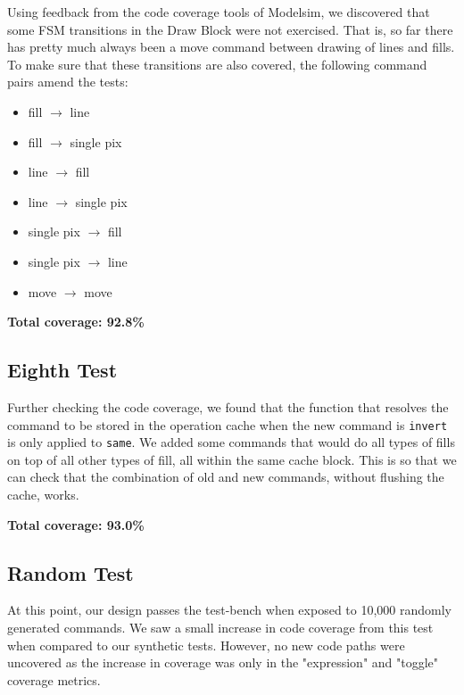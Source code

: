 \documentclass[]{article}
\begin{document}
Using feedback from the code coverage tools of Modelsim, we discovered that some FSM transitions in the Draw Block were not exercised. That is, so far there has pretty much always been a move command between drawing of lines and fills. To make sure that these transitions are also covered, the following command pairs amend the tests:
\begin{itemize}
	\item fill $\rightarrow$ line
	\item fill $\rightarrow$ single pix
	\item line $\rightarrow$ fill
	\item line $\rightarrow$ single pix
	\item single pix $\rightarrow$ fill
	\item single pix $\rightarrow$ line
	\item move $\rightarrow$ move
\end{itemize}

\textbf{Total coverage: 92.8\%}


\subsection{Eighth Test} %
\label{sub:eighth_test}

Further checking the code coverage, we found that the function that resolves the command to be stored in the operation cache when the new command is \verb"invert" is only applied to \verb"same".
We added some commands that would do all types of fills on top of all other types of fill, all within the same cache block. This is so that we can check that the combination of old and new commands, without flushing the cache, works.

\textbf{Total coverage: 93.0\%}


\subsection{Random Test} %
\label{sub:random_test}

At this point, our design passes the test-bench when exposed to 10,000 randomly generated commands. We saw a small increase in code coverage from this test when compared to our synthetic tests. However, no new code paths were uncovered as the increase in coverage was only in the "expression" and "toggle" coverage metrics.
\end{document}
